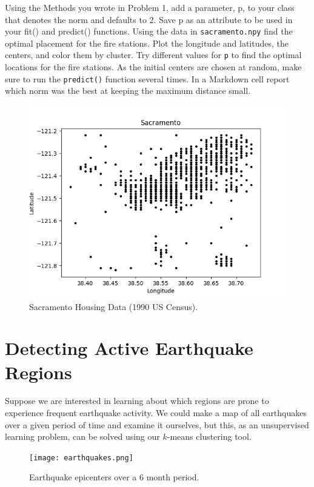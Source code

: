 \begin{problem}
Using the Methods you wrote in Problem 1, add a parameter, p, to your class that denotes the norm and defaults to 2.
Save p as an attribute to be used in your fit() and predict() functions.
Using the data in \texttt{sacramento.npy} find the optimal placement for the fire stations. 
Plot the longitude and latitudes, the centers, and color them by cluster.
Try different values for \texttt{p} to find the optimal locations for the fire stations.
As the initial centers are chosen at random, make sure to run the \texttt{predict()} function several times.
In a Markdown cell report which norm was the best at keeping the maximum distance small.

\end{problem}
\begin{figure}[H]
	\centering
	\includegraphics[width=.7\textwidth]{sacramento.png}
	\caption{Sacramento Housing Data (1990 US Census).}
	\label{fig:sacramento}
\end{figure}

\section*{Detecting Active Earthquake Regions} %

Suppose we are interested in learning about which regions are prone to experience frequent earthquake activity.
We could make a map of all earthquakes over a given period of time and examine it ourselves, but this, as an unsupervised learning problem, can be solved using our $k$-means clustering tool.

\begin{figure}[H]
    \centering
    \texttt{[image: earthquakes.png]}
    \caption{Earthquake epicenters over a 6 month period.}
    \label{fig:earthquakes}
\end{figure}

